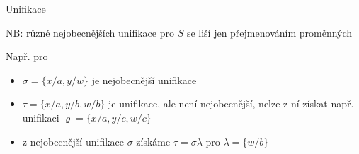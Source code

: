 \documentclass{beamer}
\begin{document}
\begin{frame}{Unifikace}
        
    
    NB: různé nejobecnějších unifikace pro $S$ se liší jen přejmenováním proměnných
    
    Např. pro  

    \begin{itemize}
        \item $\sigma=\{x/a,y/w\}$ je nejobecnější unifikace
        \item $\tau=\{x/a,y/b,w/b\}$ je unifikace, ale není nejobecnější, nelze z ní získat např. unifikaci $\varrho=\{x/a, y/c, w/c\}$
        \item z nejobecnější unifikace $\sigma$ získáme $\tau=\sigma\lambda$ pro $\lambda=\{w/b\}$
    \end{itemize}

\end{frame}
\end{document}
